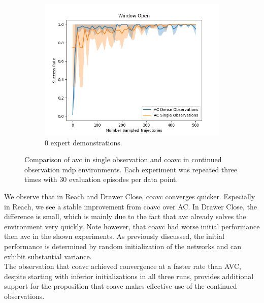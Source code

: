 \begin{figure}[htbp]
\begin{subfigure}[t]{0.32\textwidth}
    \includegraphics[width=\textwidth]{images/dense_vs_sparse_0/Window Open.png}
    \caption{0 expert demonstrations.}
  \end{subfigure}
  \caption{Comparison of \ac{avc} in single observation and \ac{coavc} in continued observation \ac{mdp} environments. Each experiment was repeated three times with 30 evaluation episodes per data point.
  }
  \label{fig:dense_vs_single}
\end{figure}

We observe that in Reach and Drawer Close, \ac{coavc} converges quicker. Especially in Reach, we see a stable improvement from \ac{coavc} over AC. In Drawer Close, the difference is 
small, which is mainly due to the fact that \ac{avc} already solves the environment very quickly. Note however, that \ac{coavc} had worse initial performance then \ac{avc} in the shown experiments. 
As previously discussed, the initial performance is determined by random initialization of the networks and can exhibit substantial 
variance.\\ 

The observation that \ac{coavc} achieved convergence at a faster rate than AVC, despite starting with inferior initializations in 
all three runs, provides additional support for the proposition that \ac{coavc} makes effective use of the continued observations. \\

